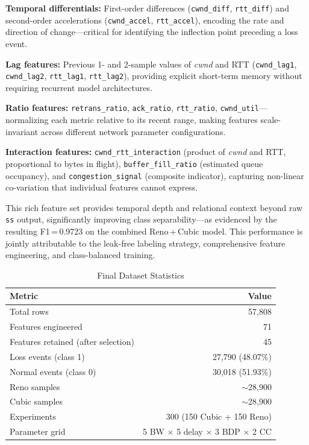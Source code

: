\documentclass[journal]{IEEEtran}
\begin{document}
\textbf{Temporal differentials:} First-order differences (\texttt{cwnd\_diff}, \texttt{rtt\_diff}) and second-order accelerations (\texttt{cwnd\_accel}, \texttt{rtt\_accel}), encoding the rate and direction of change---critical for identifying the inflection point preceding a loss event.

\textbf{Lag features:} Previous 1- and 2-sample values of \emph{cwnd} and RTT (\texttt{cwnd\_lag1}, \texttt{cwnd\_lag2}, \texttt{rtt\_lag1}, \texttt{rtt\_lag2}), providing explicit short-term memory without requiring recurrent model architectures.

\textbf{Ratio features:} \texttt{retrans\_ratio}, \texttt{ack\_ratio}, \texttt{rtt\_ratio}, \texttt{cwnd\_util}---normalizing each metric relative to its recent range, making features scale-invariant across different network parameter configurations.

\textbf{Interaction features:} \texttt{cwnd\_rtt\_interaction} (product of \emph{cwnd} and RTT, proportional to bytes in flight), \texttt{buffer\_fill\_ratio} (estimated queue occupancy), and \texttt{congestion\_signal} (composite indicator), capturing non-linear co-variation that individual features cannot express.

This rich feature set provides temporal depth and relational context beyond raw \texttt{ss} output, significantly improving class separability---as evidenced by the resulting F1\,=\,0.9723 on the combined Reno\,+\,Cubic model. This performance is jointly attributable to the leak-free labeling strategy, comprehensive feature engineering, and class-balanced training.

\begin{table}[!t]
\renewcommand{\arraystretch}{1.3}
\caption{Final Dataset Statistics}
\label{tab:dataset}
\centering
\begin{tabular}{lr}
\toprule
\textbf{Metric} & \textbf{Value} \\
\midrule
Total rows & 57,808 \\
Features engineered                    & 71 \\
Features retained (after selection)    & 45 \\
Loss events (class 1) & 27,790 (48.07\%) \\
Normal events (class 0) & 30,018 (51.93\%) \\
Reno samples & $\sim$28,900 \\
Cubic samples & $\sim$28,900 \\
Experiments & 300 (150 Cubic + 150 Reno) \\
Parameter grid & 5 BW $\times$ 5 delay $\times$ 3 BDP $\times$ 2 CC \\
\bottomrule
\end{tabular}
\end{table}
\end{document}
